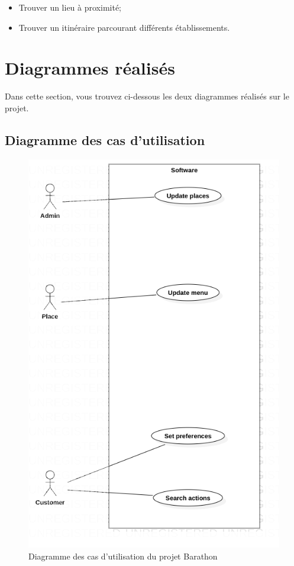 \documentclass[a4paper,11pt]{article}
\begin{document}
\begin{itemize}
 \item Trouver un lieu à proximité;
 \item Trouver un itinéraire parcourant différents établissements.
\end{itemize}

\section{Diagrammes réalisés}

Dans cette section, vous trouvez ci-dessous les deux diagrammes réalisés sur le projet.

\subsection{Diagramme des cas d'utilisation}

\begin{figure}[H]
    \centering
    \includegraphics{UseCaseDiagram1.png}
    \caption{Diagramme des cas d'utilisation du projet Barathon}
\end{figure}
\end{document}
